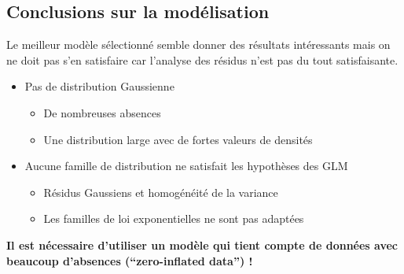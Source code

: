 \documentclass[french,a4paper]{article}
\providecommand{\tightlist}{%
  \setlength{\itemsep}{0pt}\setlength{\parskip}{0pt}}
\begin{document}
\hypertarget{conclusions-sur-la-modelisation}{%
\subsection{Conclusions sur la modélisation}\label{conclusions-sur-la-modelisation}}

Le meilleur modèle sélectionné semble donner des résultats intéressants mais on ne doit pas s'en satisfaire car l'analyse des résidus n'est pas du tout satisfaisante.

\begin{itemize}
\tightlist
\item
  Pas de distribution Gaussienne

  \begin{itemize}
  \tightlist
  \item
    De nombreuses absences
  \item
    Une distribution large avec de fortes valeurs de densités
  \end{itemize}
\item
  Aucune famille de distribution ne satisfait les hypothèses des GLM

  \begin{itemize}
  \tightlist
  \item
    Résidus Gaussiens et homogénéité de la variance
  \item
    Les familles de loi exponentielles ne sont pas adaptées
  \end{itemize}
\end{itemize}

\textbf{Il est nécessaire d'utiliser un modèle qui tient compte de données avec beaucoup d'absences (``zero-inflated data'') !}
\end{document}

